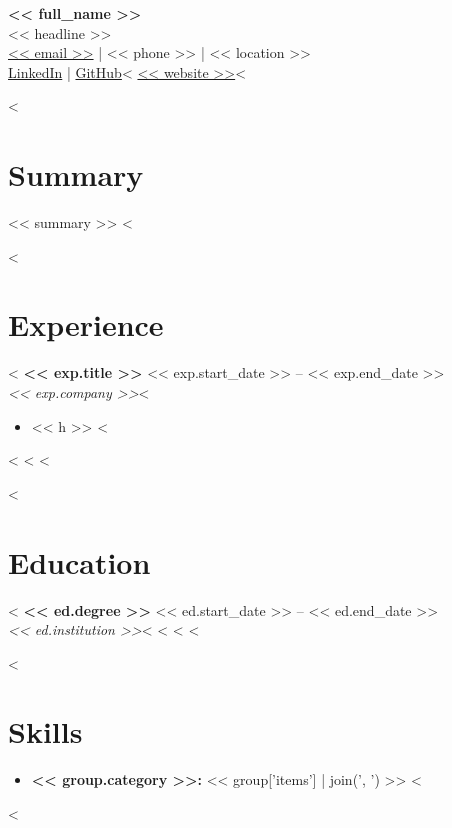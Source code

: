 \documentclass[11pt,a4paper]{article}
\begin{document}
\begin{center}
    {\Huge\bfseries << full_name >>}\\[2pt]
    {\large << headline >>}\\[4pt]
    \small
    \href{mailto:<< email >>}{<< email >>} \;|\;
    << phone >> \;|\;
    << location >> \\
    \href{<< linkedin >>}{LinkedIn} \;|\;
    \href{<< github >>}{GitHub}<%
    \href{<< website >>}{<< website >>}<%
\end{center}

<%
\section*{Summary}
<< summary >>
<%

<%
\section*{Experience}
<%
\textbf{<< exp.title >>} \hfill << exp.start_date >> -- << exp.end_date >>\\
\textit{<< exp.company >>}<%
\begin{itemize}
<%
    \item << h >>
<%
\end{itemize}
<%
\vspace{4pt}
<%
<%

<%
\section*{Education}
<%
\textbf{<< ed.degree >>} \hfill << ed.start_date >> -- << ed.end_date >>\\
\textit{<< ed.institution >>}<%
<%
\vspace{4pt}
<%
<%

<%
\section*{Skills}
\begin{itemize}
<%
    \item \textbf{<< group.category >>:} << group['items'] | join(', ') >>
<%
\end{itemize}
<%
\end{document}
